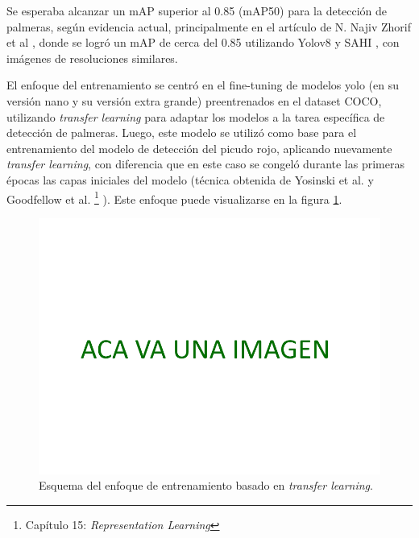 Se esperaba alcanzar un mAP superior al 0.85 (mAP50) para la detección de palmeras, según evidencia actual, principalmente en el artículo de N. Najiv Zhorif et al \citep{zhorif_implementation_2024}, donde se logró un mAP de cerca del 0.85 utilizando Yolov8 y SAHI \citep{akyon_slicing_2022}, con imágenes de resoluciones similares.

El enfoque del entrenamiento se centró en el fine-tuning de modelos yolo (en su versión nano y su versión extra grande) preentrenados en el dataset COCO, utilizando \textit{transfer learning} \citep{jacob_murel_phd_what_2024} para adaptar los modelos a la tarea específica de detección de palmeras. Luego, este modelo se utilizó como base para el entrenamiento del modelo de detección del picudo rojo, aplicando nuevamente \textit{transfer learning}, con diferencia que en este caso se congeló durante las primeras épocas las capas iniciales del modelo (técnica obtenida de Yosinski et al. \citep{yosinski_how_2014} y Goodfellow et al. \footnote{ Capítulo 15: \textit{Representation Learning}} \citep{goodfellow_deep_2016} ). Este enfoque puede visualizarse en la figura \ref{fig:training-learning}.

\begin{figure}[H]
    \centering
    \includegraphics[scale=0.5]{./Figures/place-holder.png}
    \caption{Esquema del enfoque de entrenamiento basado en \textit{transfer learning}.}
    \label{fig:training-learning}
\end{figure}

